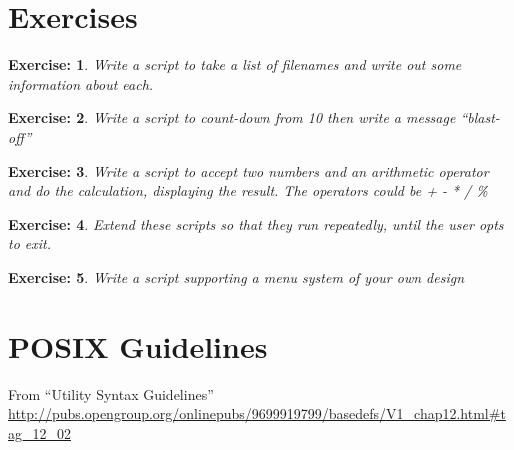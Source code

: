 \documentclass[12pt,a4paper]{article}
\newtheorem{exercise}{Exercise:}
\begin{document}
\section{Exercises}
\begin{exercise}
  Write a script to take a list of filenames and write out some
  information about each.
\end{exercise}

\begin{exercise}
Write a script to count-down from
10 then write a message ``blast-off''
\end{exercise}

\begin{exercise}
  Write a script to accept two numbers and an arithmetic operator and
  do the calculation, displaying the result. The operators could be +
  - * / \%
\end{exercise}

\begin{exercise}
  Extend these scripts so that they run repeatedly, until the user
  opts to exit.
\end{exercise}

\begin{exercise}
  Write a script supporting a menu system of your own design
\end{exercise}


\appendix
\section{POSIX Guidelines}
From ``Utility Syntax Guidelines''
\url{http://pubs.opengroup.org/onlinepubs/9699919799/basedefs/V1_chap12.html#tag_12_02}
\end{document}
